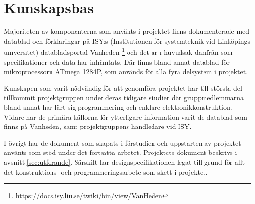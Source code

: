 


\section{Kunskapsbas}

Majoriteten av komponenterna som använts i projektet finns dokumenterade med datablad och förklaringar på ISY:s (Institutionen för systemteknik vid Linköpings universitet) databladsportal Vanheden \footnote{\url{https://docs.isy.liu.se/twiki/bin/view/VanHeden}} och det är i huvudsak därifrån som specifikationer och data har inhämtats. Där finns bland annat datablad för mikroprocessorn ATmega 1284P, som används för alla fyra delsystem i projektet. 

Kunskapen som varit nödvändig för att genomföra projektet har till största del tillkommit projektgruppen under deras tidigare studier där gruppmedlemmarna bland annat har lärt sig programmering och enklare elektronikkonstruktion. Vidare har de primära källorna för ytterligare information varit de datablad som finns på Vanheden, samt projektgruppens handledare vid ISY. 

I övrigt har de dokument som skapats i förstudien och uppstarten av projektet använts som stöd under det fortsatta arbetet. Projektets dokument beskrivs i avsnitt \ref{sec:utforande}. Särskilt har designspecifikationen legat till grund för allt det konstruktions- och programmeringsarbete som skett i projektet.